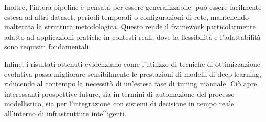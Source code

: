 \documentclass{article}
\begin{document}
Inoltre, l’intera pipeline è pensata per essere generalizzabile: può essere facilmente estesa ad altri 
dataset, periodi temporali o configurazioni di rete, mantenendo inalterata la struttura metodologica. 
Questo rende il framework particolarmente adatto ad applicazioni pratiche in contesti reali, dove la 
flessibilità e l’adattabilità sono requisiti fondamentali.

Infine, i risultati ottenuti evidenziano come l’utilizzo di tecniche di ottimizzazione evolutiva possa 
migliorare sensibilmente le prestazioni di modelli di deep learning, riducendo al contempo la necessità 
di un’estesa fase di tuning manuale. Ciò apre interessanti prospettive future, sia in termini di 
automazione del processo modellistico, sia per l’integrazione con sistemi di decisione in tempo reale 
all’interno di infrastrutture intelligenti.



\end{document}
